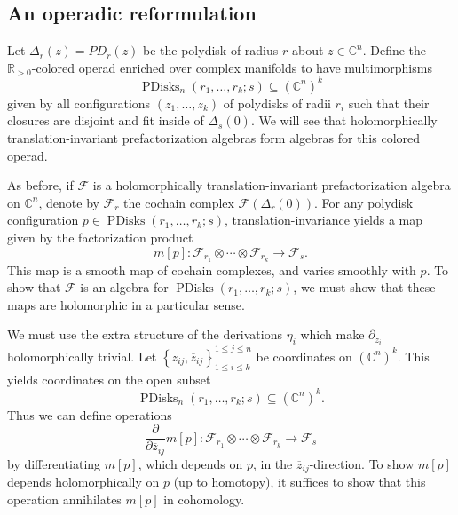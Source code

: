 \subsection{An operadic reformulation}

Let $\Delta _r(z)=PD_r(z)$ be the polydisk of radius $r$ about $z\in\mathbb{C} ^n$. Define the $\mathbb{R} _{>0} $-colored operad enriched over complex manifolds to have multimorphisms
\[
	\operatorname{PDisks} _n(r_1, \ldots ,r_k ; s) \subseteq (\mathbb{C} ^n)^k
\]
given by all configurations $(z_1, \ldots ,z_k)$ of polydisks of radii $r_i$ such that their closures are disjoint and fit inside of $\Delta _s(0)$. We will see that holomorphically translation-invariant prefactorization algebras form algebras for this colored operad.

As before, if $\mathcal{F} $ is a holomorphically translation-invariant prefactorization algebra on $\mathbb{C} ^n$, denote by $\mathcal{F} _r$ the cochain complex $\mathcal{F} (\Delta _r(0))$. For any polydisk configuration $p\in \operatorname{PDisks} (r_1, \ldots , r_k ; s)$, translation-invariance yields a map given by the factorization product
\[
	m[p] : \mathcal{F} _{r_1} \otimes \cdots \otimes \mathcal{F} _{r_k}  \to \mathcal{F} _s
.\]
This map is a smooth map of cochain complexes, and varies smoothly with $p$. To show that $\mathcal{F} $ is an algebra for $\operatorname{PDisks} (r_1, \ldots , r_k ; s)$, we must show that these maps are holomorphic in a particular sense.

We must use the extra structure of the derivations $\eta _i$ which make $\partial _{\overline{z} _i} $ holomorphically trivial. Let $\left\{z_{ij} , \overline{z} _{ij}\right\}_{1\leq i\leq k} ^{1\leq j\leq n}$ be coordinates on $(\mathbb{C} ^n)^k$. This yields coordinates on the open subset
\[
	\operatorname{PDisks} _n(r_1, \ldots , r_k ; s) \subseteq (\mathbb{C} ^n)^k
.\]
Thus we can define operations
\[
	\frac{\partial }{\partial \overline{z}_{ij} } m[p] : \mathcal{F} _{r_1} \otimes \cdots \otimes \mathcal{F} _{r_k}  \to \mathcal{F} _s
\]
by differentiating $m[p]$, which depends on $p$, in the $\overline{z} _{ij} $-direction. To show $m[p]$ depends holomorphically on $p$ (up to homotopy), it suffices to show that this operation annihilates $m[p]$ in cohomology.


